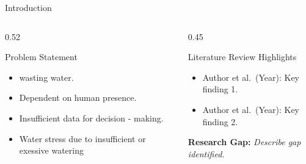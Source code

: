 \documentclass[aspectratio=169, 10pt]{beamer}
\begin{document}
\begin{frame}{Introduction}
  \begin{columns}[T]
    \begin{column}{0.52\textwidth}
      \begin{block}{Problem Statement}
        \begin{itemize}
          \item wasting water.
          \item Dependent on human presence.
          \item Insufficient data for decision - making.
          \item Water stress due to insufficient or exessive watering
        \end{itemize}
      \end{block}
    \end{column}
     \begin{column}{0.45\textwidth}
      \begin{block}{Literature Review Highlights}
        \begin{itemize}
          \item Author et al.\ (Year): Key finding 1.\cite{ref1}
          \item Author et al.\ (Year): Key finding 2.\cite{ref2}
        \end{itemize}
        \vspace{0.5em}
        \textbf{\textcolor{MLIOTcoral}{Research Gap:}}
        \textit{Describe gap identified.}
      \end{block}
    \end{column}
  \end{columns}
\end{frame}
\end{document}
